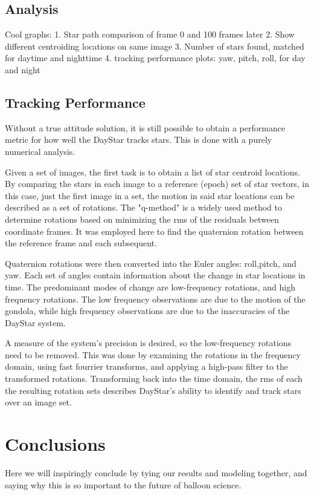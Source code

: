 \documentclass[twocolumn,letterpaper]{IEEEAerospace2012}
\begin{document}
\subsection{Analysis}
Cool graphs:
1. Star path comparison of frame 0 and 100 frames later
2. Show different centroiding locations on same image
3. Number of stars found, matched for daytime and nighttime  
4. tracking performance plots: yaw, pitch, roll, for day and night

\subsection{Tracking Performance}
Without a true attitude solution, it is still possible to obtain a performance metric for how well the DayStar tracks stars. This is done with a purely numerical analysis.

Given a set of images, the first task is to obtain a list of star centroid locations. By comparing the stars in each image to a reference (epoch) set of star vectors, in this case, just the first image in a set, the motion in said star locations can be described as a set of rotations. The "q-method" is a widely used method to determine rotations based on minimizing the rms of the residuals between coordinate frames. It was employed here to find the quaternion rotation between the reference frame and each subsequent.

Quaternion rotations were then converted into the Euler angles: roll,pitch, and yaw. Each set of angles contain information about the change in star locations in time. The predominant modes of change are low-frequency rotations, and high frequency rotations. The low frequency observations are due to the motion of the gondola, while high frequency observations are due to the inaccuracies of the DayStar system. 

A measure of the system's precision is desired, so the low-frequency rotations need to be removed. This was done by examining the rotations in the frequency domain, using fast fourrier transforms, and applying a high-pass filter to the transformed rotations. Transforming back into the time domain, the rms of each the resulting rotation sets describes DayStar's ability to identify and track stars over an image set. 

  

\section{Conclusions}
Here we will inspiringly conclude by tying our results and modeling together, and saying why this is so important to the future of balloon science.
\end{document}
